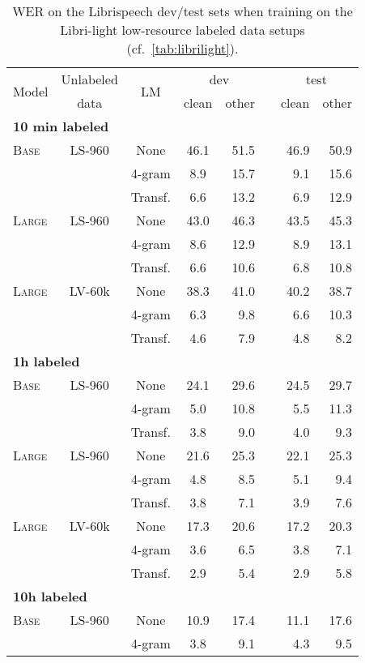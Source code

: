 \documentclass{article}
\newcommand{\wvppbase}{\textsc{Base}}
\newcommand{\wvppbig}{\textsc{Large}}
\newcommand{\libri}{Librispeech}
\newcommand{\libril}{Libri-light}
\newcommand{\voxsz}{LV-60k}
\newcommand{\librisz}{LS-960}
\begin{document}
\begin{table}[h]
\caption{WER on the \libri{} dev/test sets when training on the \libril{} low-resource labeled data setups (cf.~\autoref{tab:librilight}).
}
\label{tab:librilight_full}
\centering 
\begin{tabular}{lcccrrrr}
\toprule
\multirow{2}{*}{Model} & Unlabeled & \multirow{2}{*}{LM} & \multicolumn{2}{c}{dev} && \multicolumn{2}{c}{test} \\
\cline{4-5}\cline{7-8} 
{} & data & {} & clean & other && clean & other \\
\midrule
\midrule
\multicolumn{8}{l}{\textbf{10 min labeled}}\\
\wvppbase{} & \librisz{} & None & 46.1 & 51.5 && 46.9 & 50.9 \\
&& 4-gram & 8.9 & 15.7 && 9.1 & 15.6 \\
&& Transf. & 6.6 & 13.2 && 6.9 & 12.9 \\
\wvppbig{} & \librisz{} & None & 43.0 & 46.3 && 43.5 & 45.3 \\
&& 4-gram & 8.6 & 12.9 && 8.9 & 13.1 \\
&& Transf. & 6.6 & 10.6 && 6.8 & 10.8 \\
\wvppbig{} & \voxsz{} & None & 38.3 & 41.0 && 40.2 & 38.7 \\
&& 4-gram & 6.3 & 9.8 && 6.6 & 10.3 \\
&& Transf. & 4.6 & 7.9 && 4.8 & 8.2 \\
\midrule
\midrule
\multicolumn{8}{l}{\textbf{1h labeled}}\\
\wvppbase{} & \librisz{} & None & 24.1 & 29.6 && 24.5 & 29.7 \\
&& 4-gram & 5.0 & 10.8 && 5.5 & 11.3 \\
&& Transf. & 3.8 & 9.0 && 4.0 & 9.3 \\
\wvppbig{} & \librisz{} & None & 21.6 & 25.3 && 22.1 & 25.3 \\
&& 4-gram & 4.8 & 8.5 && 5.1 & 9.4 \\
&& Transf. & 3.8 & 7.1 && 3.9 & 7.6 \\
\wvppbig{} & \voxsz{} & None & 17.3 & 20.6 && 17.2 & 20.3 \\
&& 4-gram & 3.6 & 6.5 && 3.8 & 7.1 \\
&& Transf. & 2.9 & 5.4 && 2.9 & 5.8 \\
\midrule
\midrule
\multicolumn{8}{l}{\textbf{10h labeled}}\\
\wvppbase{} & \librisz{} & None & 10.9 & 17.4 && 11.1 & 17.6 \\
&& 4-gram & 3.8 & 9.1 && 4.3 & 9.5 \\

\end{tabular}
\end{table}
\end{document}
